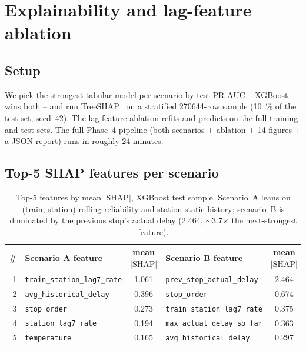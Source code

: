 \section{Explainability and lag-feature ablation}
\label{sec:xai}

\subsection{Setup}

We pick the strongest tabular model per scenario by test PR-AUC -- XGBoost wins both -- and run TreeSHAP~\cite{lundberg2017unified,lundberg2020local} on a stratified \num{270644}-row sample (\SI{10}{\percent} of the test set, seed~42). The lag-feature ablation refits and predicts on the full training and test sets. The full Phase~4 pipeline (both scenarios + ablation + 14 figures + a JSON report) runs in roughly 24 minutes.

\subsection{Top-5 SHAP features per scenario}

\begin{table}[H]
    \centering
    \caption{Top-5 features by mean $|\text{SHAP}|$, XGBoost test sample. Scenario~A leans on (train, station) rolling reliability and station-static history; scenario~B is dominated by the previous stop's actual delay (\num{2.464}, $\sim$3.7$\times$ the next-strongest feature).}
    \label{tab:shap-top5}
    \footnotesize
    \begin{tabular}{r l S[table-format=1.3] | l S[table-format=1.3]}
        \toprule
        \# & Scenario A feature & {mean $|\text{SHAP}|$} & Scenario B feature & {mean $|\text{SHAP}|$} \\
         & \texttt{train\_station\_lag7\_rate} & 1.061 & \texttt{prev\_stop\_actual\_delay}    & 2.464 \\
        2 & \texttt{avg\_historical\_delay}     & 0.396 & \texttt{stop\_order}                  & 0.674 \\
        3 & \texttt{stop\_order}                & 0.273 & \texttt{train\_station\_lag7\_rate}   & 0.375 \\
        4 & \texttt{station\_lag7\_rate}        & 0.194 & \texttt{max\_actual\_delay\_so\_far}  & 0.363 \\
        5 & \texttt{temperature}                & 0.165 & \texttt{avg\_historical\_delay}       & 0.297 \\
        \bottomrule
    \end{tabular}
\end{table}

